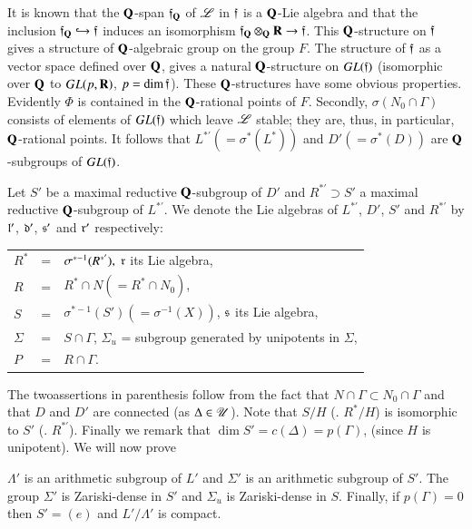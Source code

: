 It is known that the $\mathbf{Q}$-span $\mathfrak{f}_{\mathbf{Q}}$ of $\mathscr{L}$ in $\mathfrak{f}$ is a $\mathbf{Q}$-Lie algebra and that the inclusion $\mathfrak{f}_{\mathbf{Q}} \hookrightarrow \mathfrak{f}$ induces an isomorphism $\mathfrak{f}_{\mathbf{Q}} \otimes_{\mathbf{Q}} \mathbf{R} \to \mathfrak{f}$. This $\mathbf{Q}$-structure on $\mathfrak{f}$ gives a structure of $\mathbf{Q}$-algebraic group on the group $F$. The structure of $\mathfrak{f}$ as a vector space defined over $\mathbf{Q}$, gives a natural $\mathbf{Q}$-structure on $GL(\mathfrak{f})$ (isomorphic over $\mathbf{Q}$ to $GL(p,\mathbf{R})$, $p = \dim \mathfrak{f}$). These $\mathbf{Q}$-structures have some obvious properties. Evidently $\Phi$ is contained in the $\mathbf{Q}$-rational points of $F$. Secondly, $\sigma (N_0 \cap \Gamma)$ consists of elements of $GL(\mathfrak{f})$ which leave $\mathscr{L}$ stable; they are, thus, in particular, $\mathbf{Q}$-rational points. It follows that $L^{\ast'} (= \sigma^\ast (L^\ast))$ and $D'(= \sigma^\ast(D))$ are $\mathbf{Q}$-subgroups of $GL(\mathfrak{f})$.

Let $S'$ be a maximal reductive $\mathbf{Q}$-subgroup of $D'$ and $R^{\ast'} \supset S'$ a maximal reductive $\mathbf{Q}$-subgroup of $L^{\ast'}$. We denote the Lie algebras of $L^{\ast'}$, $D'$, $S'$ and $R^{\ast'}$ by $\mathfrak{l}'$, $\mathfrak{d}'$, $\mathfrak{s}'$ and $\mathfrak{r}'$ respectively:

\medskip
\begin{tabular}[l]{l@{\;}c@{\;}l}
$R^\ast$ & = & $\sigma^{\ast-1} (R^{\ast'}), \; \mathfrak{r}$ its Lie algebra,\\
$R$ & = & $R^\ast \cap N (= R^\ast \cap N_0)$,\\
$S$ &  = & $\sigma^{\ast-1} (S') (= \sigma^{-1} (X))$, $\mathfrak{s}$ its Lie algebra,\\
$\Sigma$ & = & $S \cap \Gamma$, $\Sigma_u$ = subgroup generated by unipotents in $\Sigma$,\\
$P$  & = & $R \cap \Gamma$.
\end{tabular}

\medskip
The two\pageoriginale assertions in parenthesis follow from the fact that $N \cap \Gamma \subset N_0 \cap \Gamma$ and that $D$ and $D'$ are connected (as $\Delta \in \mathscr{U}$). Note that $S/H$ (\resp. $R^\ast/H$) is isomorphic to $S'$ (\resp. $R^{\ast'}$). Finally we remark that $\dim S' = c(\Delta) =p (\Gamma)$, (since $H$ is unipotent). We will now prove

\begin{proposition}\label{art9-prop2.18}
$\Lambda'$ is an arithmetic subgroup of $L'$ and $\Sigma'$ is an arithmetic subgroup of $S'$. The group $\Sigma'$ is Zariski-dense in $S'$ and $\Sigma_u$ is Zariski-dense in $S$. Finally, if $p (\Gamma) =0$ then $S' = (e)$ and $L'/\Lambda'$ is compact.
\end{proposition}

